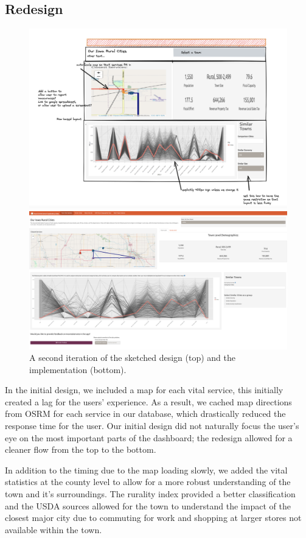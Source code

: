 \documentclass[print]{nuthesis}
\begin{document}
\hypertarget{redesign}{%
\subsection{Redesign}\label{redesign}}

\begin{figure}
\includegraphics[width=.8\textwidth]{figure/Version3.png}

\includegraphics[width=\textwidth]{figure/Version4.png}
\caption{A second iteration of the sketched design (top) and the implementation (bottom).}\label{fig:v2}
\end{figure}

In the initial design, we included a map for each vital service, this initially created a lag for the users' experience. As a result, we cached map directions from OSRM for each service in our database, which drastically reduced the response time for the user. Our initial design did not naturally focus the user's eye on the most important parts of the dashboard; the redesign allowed for a cleaner flow from the top to the bottom.

In addition to the timing due to the map loading slowly, we added the vital statistics at the county level to allow for a more robust understanding of the town and it's surroundings. The rurality index provided a better classification and the USDA sources allowed for the town to understand the impact of the closest major city due to commuting for work and shopping at larger stores not available within the town.
\end{document}
